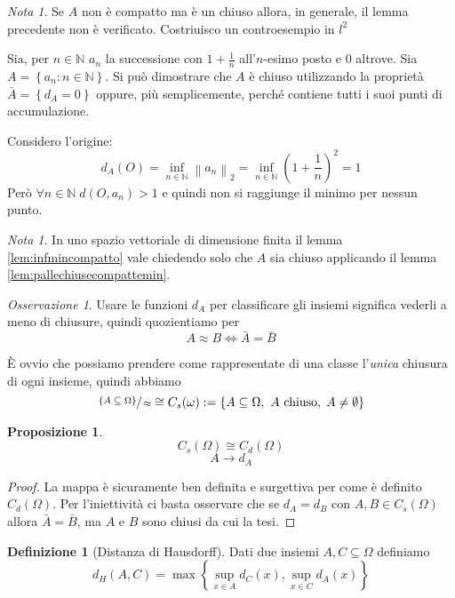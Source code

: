 \documentclass[a4paper,10pt]{article}
\newcounter{counter1}
\theoremstyle{plain}
\newtheorem{mypro}[counter1]{Proposizione}
\theoremstyle{definition}
\newtheorem{mydef}[counter1]{Definizione}
\theoremstyle{remark}
\newtheorem{mynot}[counter1]{Nota}
\newtheorem{myoss}[counter1]{Osservazione}
\newcommand{\set}[1]{\left\{#1\right\}}
\newcommand{\pa}[1]{\left(#1\right)}
\newcommand{\norm}[1]{\left\|#1\right\|}
\begin{document}
\begin{mynot}
  Se $A$ non è compatto ma è un chiuso allora, in generale, il lemma
  precedente non è verificato. Costriuisco un controesempio in $l^2$
  
  Sia, per $n\in \mathbb{N}$ $a_n$ la successione con $1+\frac{1}{n}$
  all'$n$-esimo posto e $0$ altrove. Sia $A = \set{a_n : n\in
    \mathbb{N}}$. Si pu\`o dimostrare che $A$ \`e chiuso utilizzando
  la propriet\`a $\bar A = \set {d_A = 0}$ oppure, più semplicemente,
  perché contiene tutti i suoi punti di accumulazione.

  Considero l'origine:
  \[ d_A(O) = \inf _{n\in \mathbb{N}} \norm{a_n}_2 = \inf _{n\in
    \mathbb{N}} \pa{1+\frac{1}{n}}^2 = 1 \]
  Però $\forall n\in \mathbb{N}\; d(O,a_n) > 1$ e quindi non si
  raggiunge il minimo per nessun punto.  
\end{mynot}

\begin{mynot}
  In uno spazio vettoriale di dimensione finita il lemma
  \ref{lem:infmincompatto} vale chiedendo solo che $A$ sia chiuso
  applicando il lemma \ref{lem:pallechiusecompattemin}.
\end{mynot}


\begin{myoss}
  Usare le funzioni $d_A$ per classificare gli insiemi significa
  vederli a meno di chiusure, quindi quozientiamo per
  \[ A \approx B \Leftrightarrow \bar A = \bar B \] 

  È ovvio che possiamo prendere come rappresentate di una classe
  l'\textit{unica} chiusura di ogni insieme, quindi abbiamo
  \[ \sfrac{\set{A \subseteq \Omega}}{\approx} \cong C_s(\omega) := \set{A
    \subseteq \Omega,\ A\text{ chiuso},\; A\neq \emptyset} \]
\end{myoss}
\begin{mypro}
  \[ C_s(\Omega) \cong C_d(\Omega) \]
  \[ A \rightarrow d_A \]
\end{mypro}
\begin{proof}
  La mappa è sicuramente ben definita e surgettiva per come è definito
  $C_d(\Omega)$. Per l'iniettività ci basta osservare che se $d_A =
  d_B$ con $A,B \in C_s(\Omega)$ allora $\bar A = \bar B$, ma $A$ e $B$
  sono chiusi da cui la tesi.
\end{proof}



\begin{mydef}[Distanza di Hausdorff]
  Dati due insiemi $A,C \subseteq \Omega$ definiamo
%
  \[ d_H(A,C) = \max \set{\sup _{x\in A} d_C (x) , \sup _{x\in C} d_A
    (x) } \]
\end{mydef}
\end{document}
